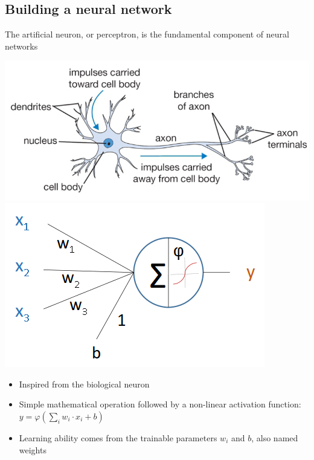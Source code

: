 \documentclass[usenames,dvipsnames]{beamer}
\begin{document}
    \subsection[Building a NN]{Building a neural network }
    \begin{frame}{\secname}{\subsecname}
        The artificial neuron, or \alert{perceptron}, is the fundamental component of neural networks
        \begin{center}
            \includegraphics[width=0.48\linewidth]{figures/DL_fundamentals/biological_neuron2.png}%
            \hspace{0.08\linewidth}
            \includegraphics[width=0.4\linewidth]{figures/DL_fundamentals/artificial_neuron.png}
        \end{center}

        \begin{itemize}
            \item Inspired from the biological neuron
            \item Simple mathematical operation followed by a non-linear \alert{activation function}: $y=\varphi(\sum_i w_i \cdot x_i + b)$
            \item Learning ability comes from the trainable \alert{parameters} $w_i$ and $b$, also named \alert{weights}
        \end{itemize}
    \end{frame}
\end{document}
